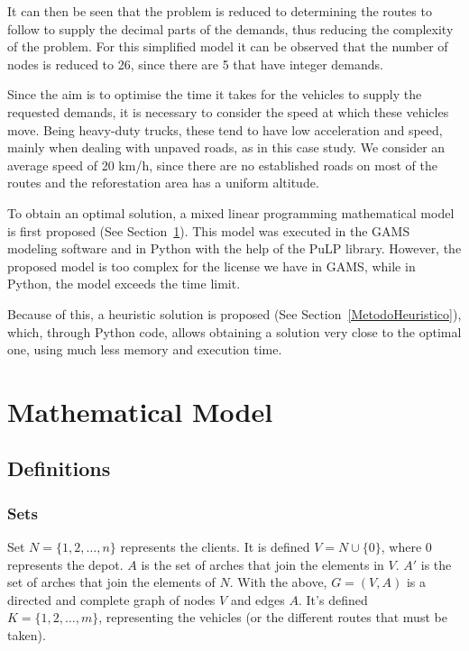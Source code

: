 \documentclass{amsart}
\begin{document}
        It can then be seen that the problem is reduced to determining the routes to follow to supply the decimal parts of the demands, thus reducing the complexity of the problem. For this simplified model it can be observed that the number of nodes is reduced to 26, since there are 5 that have integer demands.

        Since the aim is to optimise the time it takes for the vehicles to supply the requested demands, it is necessary to consider the speed at which these vehicles move. Being heavy-duty trucks, these tend to have low acceleration and speed, mainly when dealing with unpaved roads, as in this case study. We consider an average speed of 20 km/h, since there are no established roads on most of the routes and the reforestation area has a uniform altitude.

        To obtain an optimal solution, a mixed linear programming mathematical model is first proposed (See Section~\ref{ModeloMatematico}). This model was executed in the GAMS modeling software and in Python with the help of the PuLP library. However, the proposed model is too complex for the license we have in GAMS, while in Python, the model exceeds the time limit.

        Because of this, a heuristic solution is proposed (See Section~\ref{MetodoHeuristico}), which, through Python code, allows obtaining a solution very close to the optimal one, using much less memory and execution time.

    \section{Mathematical Model}\label{ModeloMatematico}

        \subsection{Definitions}
        \subsubsection{Sets}
        Set $N=\{1, 2, \ldots , n\}$ represents the clients. It is defined $V=N \cup \{0\}$, where $0$ represents the depot. $A$ is the set of arches that join the elements in $V$. $A'$ is the set of arches that join the elements of $N$. With the above, $G=(V, A)$ is a directed and complete graph of nodes $V$ and edges $A$. It's defined $K = \{1, 2, \ldots, m\}$, representing the vehicles (or the different routes that must be taken).
\end{document}
